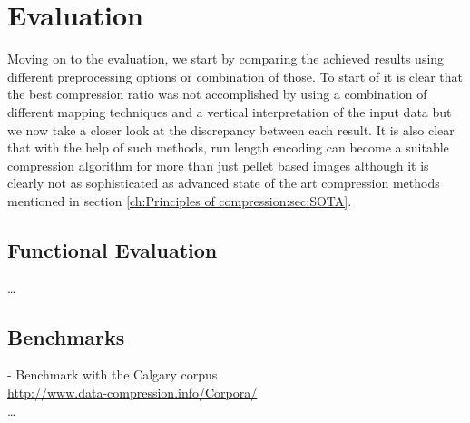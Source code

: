 
\chapter{Evaluation}
\label{ch:Evaluation}
Moving on to the evaluation, we start by comparing the achieved results using different preprocessing options or combination of those. To start of it is clear that the best compression ratio was not accomplished by using a combination of different mapping techniques and a vertical interpretation of the input data but we now take a closer look at the discrepancy between each result. It is also clear that with the help of such methods, run length encoding can become a suitable compression algorithm for more than just pellet based images although it is clearly not as sophisticated as advanced state of the art compression methods mentioned in section \ref{ch:Principles of compression:sec:SOTA}.

\section{Functional Evaluation}
\label{ch:Evaluation:sec:Functional Evaluation}

\ldots
\section{Benchmarks}
\label{ch:Evaluation:sec:Benchmarks}
- Benchmark with the Calgary corpus\\
\url{http://www.data-compression.info/Corpora/} \\
\ldots

